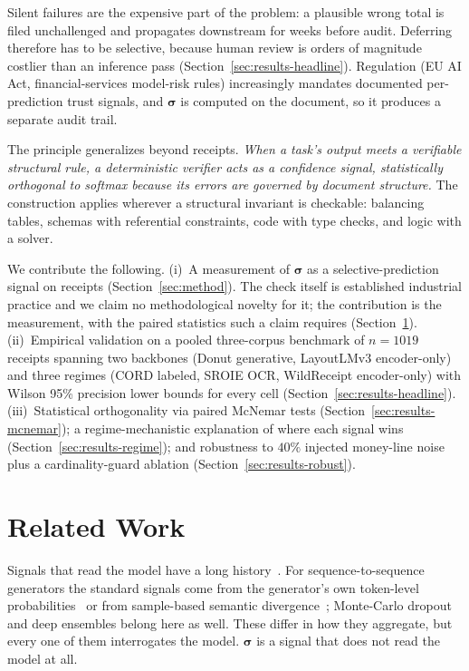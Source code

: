 \documentclass[conference]{IEEEtran}
\let\IEEEsigma\sigma
\DeclareRobustCommand{\sigma}{{\boldsymbol{\IEEEsigma}}}
\begin{document}
\noindent Silent failures are the expensive part of the problem: a
plausible wrong total is filed unchallenged and propagates downstream for
weeks before audit. Deferring therefore has to
be selective, because human
review is orders of magnitude costlier than an inference pass
(Section~\ref{sec:results-headline}). Regulation (EU AI Act,
financial-services model-risk rules) increasingly mandates documented
per-prediction trust signals, and $\sigma$ is computed on the document, so it
produces a separate audit trail.

\noindent The principle generalizes beyond receipts. \emph{When a task's output
meets a verifiable structural rule, a deterministic verifier acts as a
confidence signal, statistically orthogonal to softmax because its errors are governed
by document structure.} The construction applies wherever a structural invariant is
checkable: balancing tables, schemas with referential constraints, code with
type checks, and logic with a solver.

We contribute the following. (i)~A measurement of $\sigma$ as a
selective-prediction signal on receipts (Section~\ref{sec:method}). The check
itself is established industrial practice and we claim no methodological
novelty for it; the contribution is the measurement, with the paired
statistics such a claim requires (Section~\ref{sec:related}). (ii)~Empirical validation on a pooled
three-corpus benchmark of $n{=}1019$ receipts spanning two backbones
(Donut generative, LayoutLMv3 encoder-only) and three regimes (CORD
labeled, SROIE OCR, WildReceipt encoder-only) with Wilson 95\%
precision lower bounds for every cell (Section~\ref{sec:results-headline}).
(iii)~Statistical orthogonality via paired McNemar tests
(Section~\ref{sec:results-mcnemar}); a regime-mechanistic explanation of
where each signal wins (Section~\ref{sec:results-regime}); and robustness to
$40\%$ injected money-line noise plus a cardinality-guard ablation
(Section~\ref{sec:results-robust}).

\section{Related Work}
\label{sec:related}

\noindent Signals that read the model have a long
history~\cite{geifman2017selectivenet,elyaniv2010foundations,jaeger2024augrc}.
For sequence-to-sequence generators the standard signals come from the
generator's own token-level
probabilities~\cite{malinin2021uncertainty,vashurin2025benchmark,fadeeva2023polygraph}
or from sample-based semantic
divergence~\cite{kuhn2023semantic,farquhar2024semantic}; Monte-Carlo dropout
and deep ensembles belong here as well. These differ in how they aggregate,
but every one of them interrogates the model. $\sigma$ is a signal that does
not read the model at all.
\end{document}
